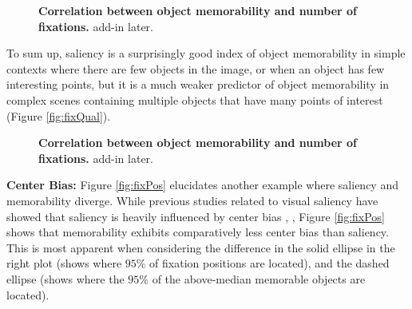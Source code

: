 \begin{figure}[t]
\centering
{}
\vspace{-5mm}\caption{\footnotesize\textbf{Correlation between object memorability and number of fixations.} add-in later. }\label{fig:fixCorr}
\end{figure}

To sum up, saliency is a surprisingly good index of object memorability in simple contexts where there are few objects in the image, or when an object has few interesting points, but it is a much weaker predictor of object memorability in complex scenes containing multiple objects that have many points of interest (Figure \ref{fig:fixQual}).

\begin{figure}[b]
\centering
{}
\vspace{-5mm}\caption{\footnotesize\textbf{Correlation between object memorability and number of fixations.} add-in later. }\label{fig:scatterFixation}
\end{figure}

\textbf{Center Bias: } Figure \ref{fig:fixPos} elucidates another example where saliency and memorability diverge. While previous studies related to visual saliency have showed that saliency is heavily influenced by center bias \cite{judd09}, \cite{sun08}, Figure \ref{fig:fixPos} shows that memorability exhibits comparatively less center bias than saliency. This is most apparent when considering the difference in the solid ellipse in the right plot (shows where $95\%$ of fixation positions are located), and the dashed ellipse (shows where the $95\%$ of the above-median memorable objects are located).


